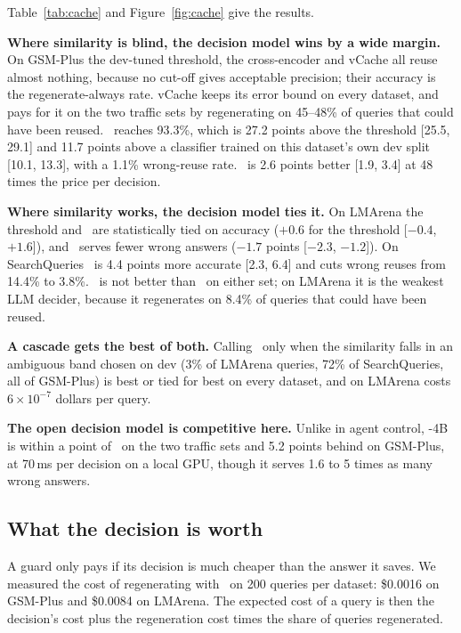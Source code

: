 Table~\ref{tab:cache} and Figure~\ref{fig:cache} give the results.

\textbf{Where similarity is blind, the decision model wins by a wide margin.}
On GSM-Plus the dev-tuned threshold, the cross-encoder and vCache all reuse almost nothing, because no cut-off gives acceptable precision; their accuracy is the regenerate-always rate.
vCache keeps its error bound on every dataset, and pays for it on the two traffic sets by regenerating on 45--48\% of queries that could have been reused.
\jev\ reaches 93.3\%, which is 27.2 points above the threshold [25.5, 29.1] and 11.7 points above a classifier trained on this dataset's own dev split [10.1, 13.3], with a 1.1\% wrong-reuse rate.
\gbig\ is 2.6 points better [1.9, 3.4] at 48 times the price per decision.

\textbf{Where similarity works, the decision model ties it.}
On LMArena the threshold and \jev\ are statistically tied on accuracy ($+0.6$ for the threshold [$-0.4$, $+1.6$]), and \jev\ serves fewer wrong answers ($-1.7$ points [$-2.3$, $-1.2$]).
On SearchQueries \jev\ is 4.4 points more accurate [2.3, 6.4] and cuts wrong reuses from 14.4\% to 3.8\%.
\gbig\ is not better than \jev\ on either set; on LMArena it is the weakest LLM decider, because it regenerates on 8.4\% of queries that could have been reused.

\textbf{A cascade gets the best of both.}
Calling \jev\ only when the similarity falls in an ambiguous band chosen on dev (3\% of LMArena queries, 72\% of SearchQueries, all of GSM-Plus) is best or tied for best on every dataset, and on LMArena costs $6\times10^{-7}$ dollars per query.

\textbf{The open decision model is competitive here.}
Unlike in agent control, \kev-4B is within a point of \jev\ on the two traffic sets and 5.2 points behind on GSM-Plus, at 70\,ms per decision on a local GPU, though it serves 1.6 to 5 times as many wrong answers.

\subsection{What the decision is worth}

A guard only pays if its decision is much cheaper than the answer it saves.
We measured the cost of regenerating with \gbig\ on 200 queries per dataset: \$0.0016 on GSM-Plus and \$0.0084 on LMArena.
The expected cost of a query is then the decision's cost plus the regeneration cost times the share of queries regenerated.

